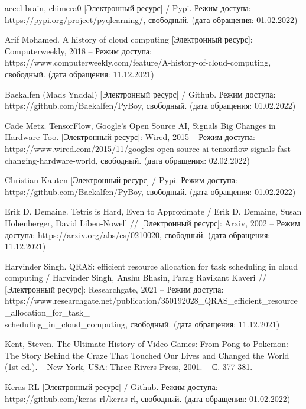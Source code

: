 \documentclass{article}
\begin{document}
\begin{center}
\begin{thebibliography}{}
 accel-brain, chimera0 [Электронный ресурс] / Pypi. Режим доступа: https://pypi.org/project/pyqlearning/, свободный. (дата обращения: 01.02.2022)

 Arif Mohamed. A history of cloud computing [Электронный ресурс]: Сomputerweekly, 2018 – Режим доступа: https://www.computerweekly.com/feature/A-history-of-cloud-computing, свободный. (дата обращения: 11.12.2021)

 Baekalfen (Mads Ynddal) [Электронный ресурс] / Github. Режим доступа: https://github.com/Baekalfen/PyBoy, свободный. (дата обращения: 01.02.2022)

 Cade Metz. TensorFlow, Google's Open Source AI, Signals Big Changes in Hardware Too. [Электронный ресурс]: Wired, 2015 – Режим доступа: https://www.wired.com/2015/11/googles-open-source-ai-tensorflow-signals-fast-changing-hardware-world, свободный. (дата обращения: 02.02.2022) 

 Christian Kauten [Электронный ресурс] / Pypi. Режим доступа: https://github.com/Baekalfen/PyBoy, свободный. (дата обращения: 01.02.2022)

 Erik D. Demaine. Tetris is Hard, Even to Approximate / Erik D. Demaine, Susan Hohenberger, David Liben-Nowell // [Электронный ресурс]: Arxiv, 2002 – Режим доступа: https://arxiv.org/abs/cs/0210020, свободный. (дата обращения: 11.12.2021)

 Harvinder Singh. QRAS: efficient resource allocation for task scheduling in cloud computing / Harvinder Singh, Anshu Bhasin, Parag Ravikant Kaveri // [Электронный ресурс]: Researchgate, 2021 – Режим доступа: https://www.researchgate.net/publication/350192028\_QRAS\_efficient\_resource\_allocation\_for\_task\_\\scheduling\_in\_cloud\_computing, свободный. (дата обращения: 11.12.2021)

 Kent, Steven. The Ultimate History of Video Games: From Pong to Pokemon: The Story Behind the Craze That Touched Our Lives and Changed the World (1st ed.). – New York, USA: Three Rivers Press, 2001. – С. 377-381.

 Keras-RL [Электронный ресурс] / Github. Режим доступа: https://github.com/keras-rl/keras-rl, свободный. (дата обращения: 01.02.2022)


\end{thebibliography}
\end{center}
\end{document}
